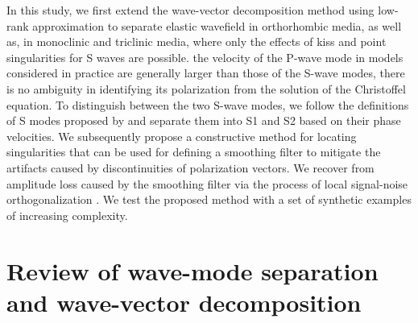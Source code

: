 In this study, we first extend the wave-vector decomposition method using low-rank approximation \cite[]{chengfomel}  to separate elastic wavefield in orthorhombic media, as well as, in monoclinic and triclinic media, where only the effects of kiss and point singularities for S waves are possible.  the velocity of the P-wave mode in models considered in practice are generally larger than those of the S-wave modes, there is no ambiguity in identifying its polarization from the solution of the Christoffel equation. To distinguish between the two S-wave modes, we follow the definitions of S modes proposed by \cite{joethesis} and separate them into S1 and S2 based on their phase velocities. We subsequently propose a constructive method for locating singularities that can be used for defining a smoothing filter  to mitigate the artifacts caused by discontinuities of polarization vectors. We recover from amplitude loss caused by the smoothing filter via the process of local signal-noise orthogonalization \cite[]{yangkang}. We test the proposed method with a set of synthetic examples of increasing complexity.


\section{Review of wave-mode separation and wave-vector decomposition}
